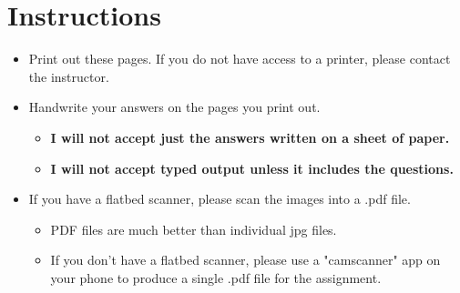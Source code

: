 \documentclass[letterpaper,12pt]{exam}
\begin{document}
\section*{Instructions}
\begin{itemize}
	\item Print out these pages.  If you do not have access to a printer, please contact the instructor.
	\item Handwrite your answers on the pages you print out. 
	   \begin{itemize}
		  \item \textbf{I will not accept just the answers written on a sheet of paper.}  
		  \item \textbf{I will not accept typed output unless it includes the questions.}
	   \end{itemize}
	\item If you have a flatbed scanner, please scan the images into a .pdf file.  
	  \begin{itemize}
         \item PDF files are much better than individual jpg files.
         \item If you don't have a flatbed scanner, please use a "camscanner" app on your phone to produce a single .pdf file for the assignment.
      \end{itemize}
\end{itemize}
\end{document}
